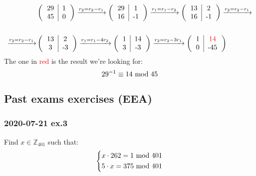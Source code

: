 \begin{align*}
    &\left(\begin{tabular}{c|c}
        29&1\\
        45&0
    \end{tabular}\right)\xrightarrow[]{r_2=r_2-r_1}
    \left(\begin{tabular}{c|c}
        29&1\\
        16&-1
    \end{tabular}\right)\xrightarrow[]{r_1=r_1-r_2}
    \left(\begin{tabular}{c|c}
        13&2\\
        16&-1
    \end{tabular}\right)\xrightarrow[]{r_2=r_2-r_1}\\\\\xrightarrow[]{r_2=r_2-r_1}
    &\left(\begin{tabular}{c|c}
        13&2\\
        3&-3
    \end{tabular}\right)\xrightarrow[]{r_1=r_1-4r_2}
    \left(\begin{tabular}{c|c}
        1&14\\
        3&-3
    \end{tabular}\right)\xrightarrow[]{r_2=r_2-3r_1}
    \left(\begin{tabular}{c|c}
        1&\textcolor{red}{14}\\
        0&-45
    \end{tabular}\right)
\end{align*}
The one in \textcolor{red}{red} is the result we're looking for:
$$29^{-1}\equiv14\text{ mod }45$$


\newpage
\subsection{Past exams exercises (EEA)}
\subsubsection{2020-07-21 ex.3}
Find $x\in\mathbb{Z}_{401}$ such that:
\begin{equation*}
  \left\{
    \begin{aligned}
      & x\cdot262=1\text{ mod }401 \\
      & 5\cdot x=375\text{ mod }401
    \end{aligned}
  \right.
\end{equation*}
